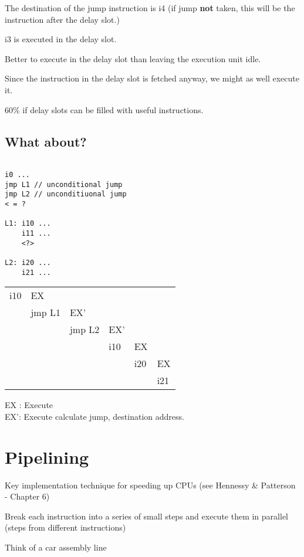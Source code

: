 \documentclass[a4paper,12pt]{article}
\begin{document}
The destination of the jump instruction is i4 (if jump \textbf{not}
taken, this will be the instruction after the delay slot.)

i3 is executed in the delay slot.

Better to execute in the delay slot than leaving the execution unit
idle.

Since the instruction in the delay slot is fetched anyway, we might as
well execute it.

$60$\% if delay slots can be filled with useful instructions.

\subsection*{What about?}

\begin{verbatim}

i0 ...
jmp L1 // unconditional jump
jmp L2 // unconditiuonal jump
< = ?

L1: i10 ...
    i11 ...
    <?>

L2: i20 ...
    i21 ...

\end{verbatim}

\begin{tabular}{|l|l|l|l|l|l|}

i10	& EX	 	&			&			&			&			\\
		& jmp L1	& EX'		&			&			&			\\
		&		 	& jmp L2	& EX'		&			&			\\
		&		 	&			& i10		& EX		&			\\
		&		 	&			&			& i20		& EX		\\
		&		 	&			&			&			& i21		\\
\end{tabular}

EX : Execute \\
EX': Execute calculate jump, destination address.

\section*{Pipelining}

Key implementation technique for speeding up CPUs (see Hennessy \&
Patterson - Chapter 6)

Break each instruction into a series of small steps and execute them in
parallel (steps from different instructions)

\indent Think of a car assembly line
\end{document}
